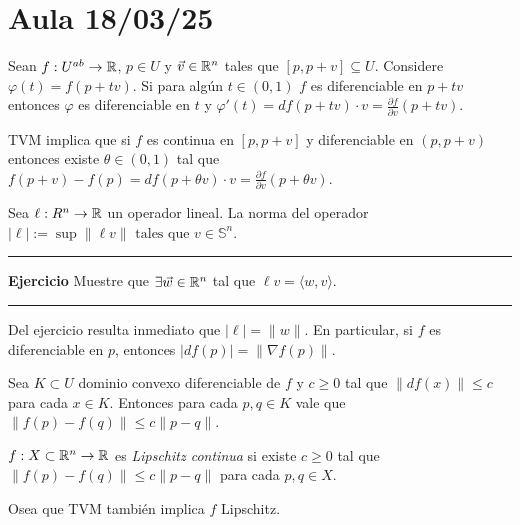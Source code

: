\section*{Aula 18/03/25}

\begin{proposition}
    Sean \(f:U^{ab} \rightarrow \mathbb{R} \), \(p\in U\) y \(\vec{v} \in \mathbb{R}^n\) tales que \([p,p+v]\subseteq U\). Considere \(\varphi(t) = f(p+tv)\). Si para algún \(t\in (0,1)\) \(f\) es diferenciable en \(p+tv\) entonces \(\varphi\) es diferenciable en \(t\) y \(\varphi\prime (t) = df(p+tv)\cdot v= \frac{\partial f }{\partial v} (p+tv)\). 
\end{proposition}
\begin{note}
    TVM implica que si \(f\) es continua en \([p,p+v]\) y diferenciable en \((p,p+v)\) entonces existe \(\theta \in (0,1)\) tal que \(f(p+v)-f(p)= df(p+\theta v )\cdot v = \frac{\partial f}{\partial v}(p+\theta v)\). 
\end{note}
\begin{definition}
    Sea \(\ell: R^n\rightarrow \mathbb{R}\) un operador lineal. La norma del operador \(|\ell | := \sup \|\ell v\| \text{ tales que } v\in \mathbb{S}^n\).  
\end{definition}

\E

\hrule
\begin{proposition}
    \textbf{Ejercicio} Muestre que \(\exists \vec{w}\in \mathbb{R}^n\) tal que \(\ell v = \langle w, v \rangle \). 
\end{proposition}
\hrule 

\E 

\begin{note}
    Del ejercicio resulta inmediato que \(|\ell | = \|w\|\). En particular, si \(f\) es diferenciable en \(p\), entonces \(|df(p)|= \|\nabla f (p)\|\). 
\end{note}
\begin{proposition}
   Sea \(K\subset U\) dominio convexo diferenciable de \(f\) y \( c\geq 0 \) tal que \(\|df(x)\|\leq c\) para cada \(x\in K\). Entonces para cada \(p,q\in K \) vale que \(\|f(p)-f(q)\|\leq c \|p-q\|\). 
\end{proposition}
\begin{definition}
    \(f:X\subset \mathbb{R}^n\rightarrow \mathbb{R} \) es \emph{Lipschitz continua} si existe \(c\geq 0\) tal que \(\|f(p)-f(q)\|\leq c \|p-q\|\) para cada \(p,q \in X\). 
\end{definition}
\begin{note}
    Osea que TVM también implica \(f\) Lipschitz. 
\end{note}

